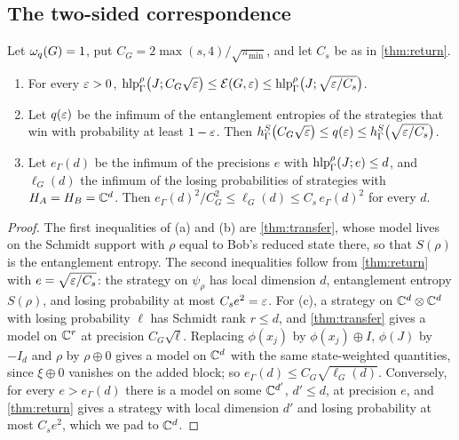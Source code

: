 \subsection{The two-sided correspondence}

\begin{corollary}\label{cor:two-sided}
Let $\omega_{q}(G)=1$, put $C_G=2\max(s,4)/\sqrt{\pi_{\min}}$, and let $C_s$ be as in \cref{thm:return}.
\begin{enumerate}[label=(\alph*),itemsep=1pt]
\item For every $\varepsilon>0$, $\operatorname{hlp}^{\rho}_\Gamma\bigl(J;C_G\sqrt{\varepsilon}\bigr)\le\mathcal E(G,\varepsilon)\le\operatorname{hlp}^{\rho}_\Gamma\bigl(J;\sqrt{\varepsilon/C_s}\bigr)$.
\item Let $q(\varepsilon)$ be the infimum of the entanglement entropies of the strategies that win with probability at least $1-\varepsilon$. Then
$h^{S}_\Gamma\bigl(C_G\sqrt{\varepsilon}\bigr)\le q(\varepsilon)\le h^{S}_\Gamma\bigl(\sqrt{\varepsilon/C_s}\bigr)$.
\item Let $e_\Gamma(d)$ be the infimum of the precisions $e$ with $\operatorname{hlp}^{\rho}_\Gamma(J;e)\le d$, and $\ell_G(d)$ the infimum of the losing
probabilities of strategies with $H_A=H_B=\mathbb C^d$. Then $e_\Gamma(d)^2/C_G^2\le\ell_G(d)\le C_s\,e_\Gamma(d)^2$ for every $d$.
\end{enumerate}
\end{corollary}

\begin{proof}
The first inequalities of (a) and (b) are \cref{thm:transfer}, whose model lives on the Schmidt support with $\rho$ equal to Bob's reduced
state there, so that $S(\rho)$ is the entanglement entropy. The second inequalities follow from \cref{thm:return} with $e=\sqrt{\varepsilon/C_s}$:
the strategy on $\psi_\rho$ has local dimension $d$, entanglement entropy $S(\rho)$, and losing probability at most $C_se^2=\varepsilon$. For (c),
a strategy on $\mathbb C^d\otimes\mathbb C^d$ with losing probability $\ell$ has Schmidt rank $r\le d$, and \cref{thm:transfer} gives a model on $\mathbb C^r$ at
precision $C_G\sqrt\ell$. Replacing $\phi(x_j)$ by $\phi(x_j)\oplus I$, $\phi(J)$ by $-I_d$ and $\rho$ by $\rho\oplus0$ gives a model on
$\mathbb C^d$ with the same state-weighted quantities, since $\xi\oplus0$ vanishes on the added block; so $e_\Gamma(d)\le C_G\sqrt{\ell_G(d)}$.
Conversely, for every $e>e_\Gamma(d)$ there is a model on some $\mathbb C^{d'}$, $d'\le d$, at precision $e$, and \cref{thm:return} gives a strategy
with local dimension $d'$ and losing probability at most $C_se^2$, which we pad to $\mathbb C^d$.
\end{proof}

